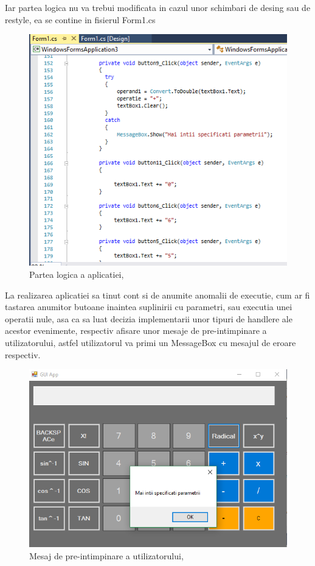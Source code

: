 Iar partea logica nu va trebui modificata in cazul unor schimbari de desing sau de restyle,
ea se contine in fisierul Form1.cs

\begin{figure}[!ht]
                     \centering
                     \includegraphics[scale = 0.6]{logic}
                     \caption{Partea logica a aplicatiei, \cite{ImRef}}
                     \label{Im_label}
                \end{figure}
                
La realizarea aplicatiei sa tinut cont si de anumite anomalii de executie, cum ar fi tastarea anumitor butoane 
inaintea suplinirii cu parametri, sau executia unei operatii nule, asa  ca sa luat decizia implementarii 
unor tipuri de handlere ale acestor evenimente, respectiv afisare unor mesaje de pre-intimpinare  
a utilizatorului, astfel utilizatorul va primi un MessageBox cu mesajul de eroare respectiv.


\begin{figure}[!ht]
                     \centering
                     \includegraphics[scale = 1]{Error}
                     \caption{Mesaj de pre-intimpinare a utilizatorului, \cite{ImRef}}
                     \label{Im_label}
                \end{figure}
               


\clearpage